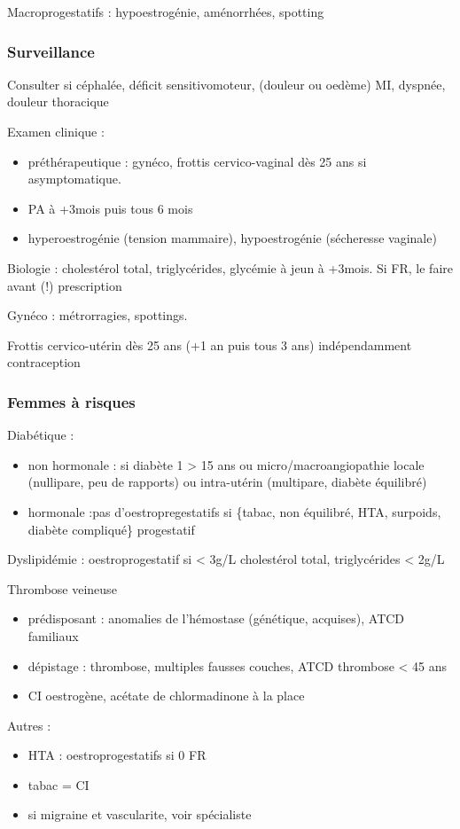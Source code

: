 \documentclass[11pt]{article}
\begin{document}
Macroprogestatifs : hypoestrogénie, aménorrhées, spotting

\subsubsection{Surveillance}
\label{sec:org24ebb2c}
Consulter si céphalée, déficit sensitivomoteur, (douleur ou oedème) MI, dyspnée,
douleur thoracique

Examen clinique : 
\begin{itemize}
\item préthérapeutique : gynéco, frottis cervico-vaginal dès 25 ans si
asymptomatique.
\item PA à +3mois puis tous 6 mois
\item hyperoestrogénie (tension mammaire), hypoestrogénie (sécheresse vaginale)
\end{itemize}
Biologie : cholestérol total, triglycérides, glycémie à jeun à +3mois. Si FR, le
faire avant (!) prescription

Gynéco : métrorragies, spottings. 

Frottis cervico-utérin dès 25 ans (+1 an puis tous 3 ans) indépendamment contraception

\subsubsection{Femmes à risques}
\label{sec:orgdac487b}
Diabétique :
\begin{itemize}
\item non hormonale : si diabète 1 > 15 ans ou micro/macroangiopathie \thus locale
(nullipare, peu de rapports) ou intra-utérin (multipare, diabète équilibré)
\item hormonale :pas d'oestropregestatifs si \{tabac, non équilibré, HTA, surpoids,
diabète compliqué\} \thus progestatif
\end{itemize}
Dyslipidémie : oestroprogestatif si < 3g/L cholestérol total, triglycérides <
2g/L

Thrombose veineuse
\begin{itemize}
\item prédisposant : anomalies de l'hémostase (génétique, acquises), ATCD familiaux
\item dépistage : thrombose, multiples fausses couches, ATCD thrombose < 45 ans
\item CI oestrogène, acétate de chlormadinone à la place
\end{itemize}

Autres :
\begin{itemize}
\item HTA : oestroprogestatifs si 0 FR
\item tabac = CI
\item si migraine et vascularite, voir spécialiste
\end{itemize}
\end{document}
